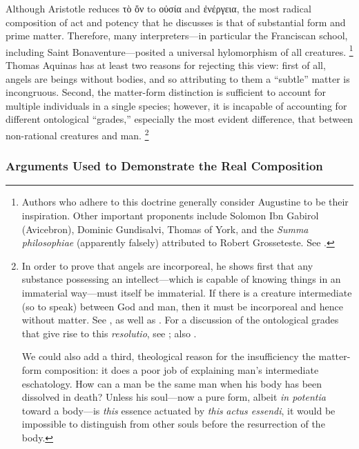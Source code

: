 Although Aristotle reduces τὸ ὄν to οὐσία and ἐνέργεια, the most radical composition of act and potency that he discusses is that of substantial form and prime matter. Therefore, many interpreters—in particular the Franciscan school, including Saint Bonaventure—posited a universal hylomorphism of all creatures.%
%
\footnote{Authors who adhere to this doctrine generally consider Augustine to be their inspiration. Other important proponents include Solomon Ibn Gabirol (Avicebron), Dominic Gundisalvi, Thomas of York, and the \emph{Summa philosophiae} (apparently falsely) attributed to Robert Grosseteste. See \cite{stanford:binarium}.}
%
Thomas Aquinas has at least two reasons for rejecting this view: first of all, angels are beings without bodies, and so attributing to them a “subtle” matter is incongruous. Second, the matter-form distinction is sufficient to account for multiple individuals in a single species; however, it is incapable of accounting for different ontological “grades,” especially the most evident difference, that between non-rational creatures and man.%
%
\footnote{In order to prove that angels are incorporeal, he shows first that any substance possessing an intellect—which is capable of knowing things in an immaterial way—must itself be immaterial. If there is a creature intermediate (so to speak) between God and man, then it must be incorporeal and hence without matter. See \cite[I, q.~50, a.~1, co., and a.~2]{st:summa}, as well as \cite[208]{fabro:nozione}.
For a discussion of the ontological grades that give rise to this \emph{resolutio}, see \cite[209–212]{izquierdo:vita}; also \cite[38–43]{lucas:hombre}.

We could also add a third, theological reason for the insufficiency the matter-form composition: it does a poor job of explaining man’s intermediate eschatology. How can a man be the same man when his body has been dissolved in death? Unless his soul—now a pure form, albeit \emph{in potentia} toward a body—is \emph{this} essence actuated by \emph{this} \emph{actus essendi}, it would be impossible to distinguish from other souls before the resurrection of the body.}
%

\subsubsection{Arguments Used to Demonstrate the Real Composition}
\label{arguments-real-composition}

